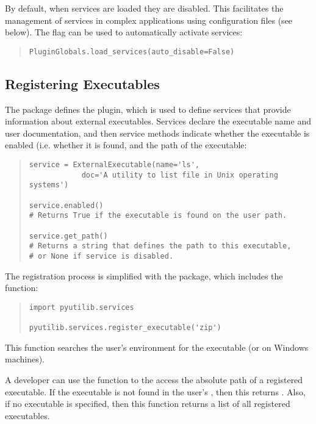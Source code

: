 By default, when services are loaded they are disabled.  This facilitates the management of
services in complex applications using 
configuration files (see below).  The  flag can be used
to automatically activate services:
\begin{quotation}
\begin{lstlisting}
PluginGlobals.load_services(auto_disable=False)
\end{lstlisting}
\end{quotation}


\subsection{Registering Executables}

The  package defines the  plugin, which is used to define services that provide
information about external executables. Services declare the executable
name and user documentation, and then service methods indicate whether
the executable is enabled (i.e. whether it is found, and the path of
the executable:
\begin{quotation}
\begin{lstlisting}
service = ExternalExecutable(name='ls', 
            doc='A utility to list file in Unix operating systems')

service.enabled()     
# Returns True if the executable is found on the user path.

service.get_path()
# Returns a string that defines the path to this executable, 
# or None if service is disabled.
\end{lstlisting}
\end{quotation}
The registration process is simplified with the  package, 
which includes the  function:
\begin{quotation}
\begin{lstlisting}
import pyutilib.services

pyutilib.services.register_executable('zip')
\end{lstlisting}
\end{quotation}
This function searches the user's  environment for the  executable (or  on Windows machines).  

A developer can use the  function to the
access the absolute path of a registered executable.  If the executable
is not found in the user's , then this returns .
Also, if no executable is specified, then this function returns a list
of all registered executables.


